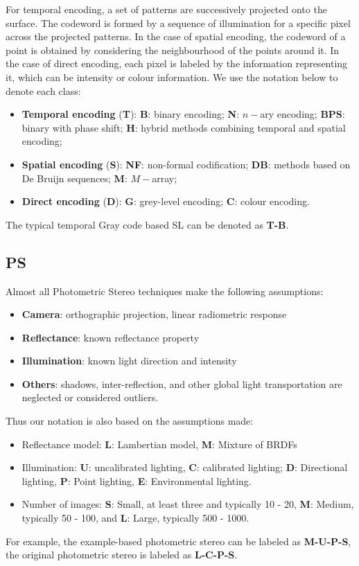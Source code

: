 For temporal encoding, a set of patterns are successively projected onto the surface. The codeword is formed by a sequence of illumination for a specific pixel across the projected patterns. In the case of spatial encoding, the codeword of a point is obtained by considering the neighbourhood of the points around it. In the case of direct encoding, each pixel is labeled by the information representing it, which can be intensity or colour information. We use the notation below to denote each class:
\begin{itemize}
\item \textbf{Temporal encoding} (\textbf{T}): \textbf{B}: binary encoding; \textbf{N}: $n-$ary encoding; \textbf{BPS}: binary with phase shift; \textbf{H}: hybrid methods combining temporal and spatial encoding;
\item \textbf{Spatial encoding} (\textbf{S}): \textbf{NF}: non-formal codification; \textbf{DB}: methods based on  De Bruijn sequences; \textbf{M}: $M-$array;
\item \textbf{Direct encoding} (\textbf{D}): \textbf{G}: grey-level encoding; \textbf{C}: colour encoding.
\end{itemize}

The typical temporal Gray code based SL can be denoted as \textbf{T-B}.

\subsection{PS}
Almost all Photometric Stereo techniques make the following assumptions:
\begin{itemize}
\item \textbf{Camera}: orthographic projection, linear radiometric response
\item \textbf{Reflectance}: known reflectance property
\item \textbf{Illumination}: known light direction and intensity
\item \textbf{Others}: shadows, inter-reflection, and other global light transportation are neglected or considered outliers.
\end{itemize}

Thus our notation is also based on the assumptions made:
\begin{itemize}
\item Reflectance model: \textbf{L}: Lambertian model, \textbf{M}: Mixture of BRDFs
\item Illumination: \textbf{U}: uncalibrated lighting, \textbf{C}: calibrated lighting; \textbf{D}: Directional lighting, \textbf{P}: Point lighting, \textbf{E}: Environmental lighting.
\item Number of images: \textbf{S}: Small, at least three and typically 10 - 20, \textbf{M}: Medium, typically 50 - 100, and \textbf{L}: Large, typically 500 - 1000.
\end{itemize}
For example, the example-based photometric stereo can be labeled as \textbf{M-U-P-S}, the original photometric stereo is labeled as \textbf{L-C-P-S}.

